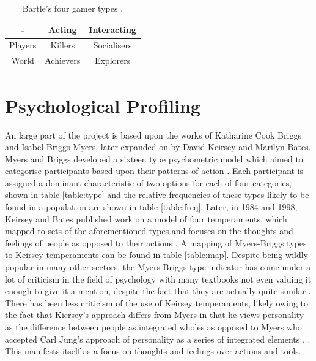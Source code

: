 \documentclass[12pt,a4paper,twoside]{report}
\begin{document}
\begin{table}
\begin{center}
\begin{tabular}{|c|c|c|}
	\hline - & Acting & Interacting \\ 
	\hline Players & Killers & Socialisers \\ 
	\hline World & Achievers & Explorers \\ 
	\hline 
\end{tabular}
\end{center}
\caption{Bartle's four gamer types \cite{bartle1996hearts}.}
\label{table:cards}
\end{table}

\section{Psychological Profiling}

An large part of the project is based upon the works of Katharine Cook Briggs and Isabel Briggs Myers, later expanded on by David Keirsey and Marilyn Bates. Myers and Briggs developed a sixteen type psychometric model which aimed to categorise participants based upon their patterns of action \cite{myers1995gifts}. Each participant is assigned a dominant characteristic of two options for each of four categories, shown in table \ref{table:type} and the relative frequencies of these types likely to be found in a population are shown in table \ref{table:freq}. Later, in 1984 and 1998, Keirsey and Bates published work on a model of four temperaments, which mapped to sets of the aforementioned types and focuses on the thoughts and feelings of people as opposed to their actions \cite{keirsey1984} \cite{keirsey1998please}. A mapping of Myers-Briggs types to Keirsey temperaments can be found in table \ref{table:map}. Despite being wildly popular in many other sectors, the Myers-Briggs type indicator has come under a lot of criticism in the field of psychology with many textbooks not even valuing it enough to give it a mention, despite the fact that they are actually quite similar \cite{lloyd2012myers}. There has been less criticism of the use of Keirsey temperaments, likely owing to the fact that Kiersey's approach differs from Myers in that he views personality as the difference between people as integrated wholes as opposed to Myers who accepted Carl Jung's approach of personality as a series of integrated elements \cite{jung1923psychological}, \cite{keirsey1998please}. This manifests itself as a focus on thoughts and feelings over actions and tools.
\end{document}
